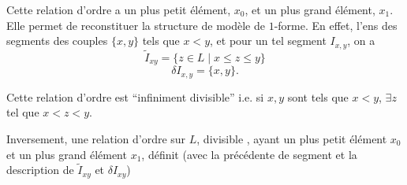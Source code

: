
Cette relation d'ordre a un plus petit élément, $x_0$, et un plus grand élément, $x_1$. Elle permet de reconstituer la structure de modèle de $1$-forme. En effet, l'ens des segments    des couples $\{x,y\}$ tels que $x<y$, et pour un tel segment $I_{x,y}$, on a
\[
\tilde I_{xy}=\{z\in L\mid x\leq z\leq y\}
\]
\[
\delta I_{x,y}=\{x,y\}.
\]

Cette relation d'ordre est ``infiniment divisible'' i.e. si $x,y$ sont tels que $x<y$, $\exists z$ tel que $x<z<y$.



Inversement, une relation d'ordre sur $L$, divisible , ayant un plus petit élément  $x_0$ et un plus grand élément $x_1$, définit (avec la  précédente de segment  et  la description de $\tilde I_{xy}$ et $\delta I_{xy}$)


